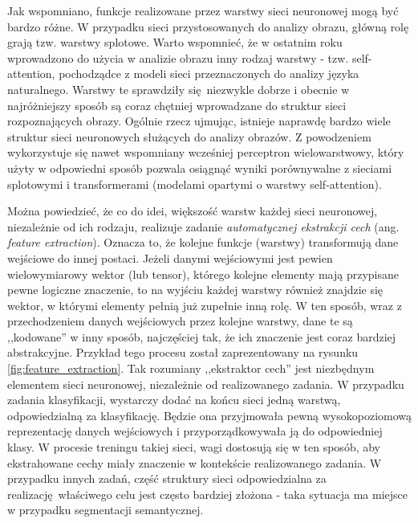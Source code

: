 \documentclass{classrep}
\begin{document}
{        %
        Jak wspomniano, funkcje realizowane przez warstwy sieci neuronowej mogą być bardzo różne. W
        przypadku sieci przystosowanych do analizy obrazu, główną rolę grają tzw. warstwy splotowe. Warto
        wspomnieć, że w ostatnim roku wprowadzono do użycia w analizie obrazu inny rodzaj warstwy - tzw.
        self-attention, pochodządce z modeli sieci przeznaczonych do analizy języka naturalnego. Warstwy te
        sprawdziły się niezwykle dobrze i obecnie w najróżniejszy sposób są coraz chętniej wprowadzane do
        struktur sieci rozpoznających obrazy. Ogólnie rzecz ujmując, istnieje naprawdę bardzo wiele struktur
        sieci neuronowych służących do analizy obrazów. Z powodzeniem wykorzystuje się nawet wspomniany
        wcześniej perceptron wielowarstwowy, który użyty w odpowiedni sposób pozwala osiągnąć wyniki
        porównywalne z sieciami splotowymi i transformerami (modelami opartymi o warstwy self-attention).

        Można powiedzieć, że co do idei, większość warstw każdej sieci neuronowej, niezależnie od ich
        rodzaju, realizuje zadanie \emph{automatycznej ekstrakcji cech} (ang. \emph{feature extraction}).
        Oznacza to, że kolejne funkcje (warstwy) transformują dane wejściowe do innej postaci. Jeżeli danymi
        wejściowymi jest pewien wielowymiarowy wektor (lub tensor), którego kolejne elementy mają przypisane
        pewne logiczne znaczenie, to na wyjściu każdej warstwy również znajdzie się wektor, w którymi
        elementy pełnią już zupełnie inną rolę. W ten sposób, wraz z przechodzeniem danych wejściowych przez
        kolejne warstwy, dane te są ,,kodowane'' w inny sposób, najczęściej tak, że ich znaczenie jest coraz
        bardziej abstrakcyjne. Przykład tego procesu został zaprezentowany na rysunku
        \ref{fig:feature_extraction}. Tak rozumiany ,,ekstraktor cech'' jest niezbędnym elementem sieci
        neuronowej, niezależnie od realizowanego zadania. W przypadku zadania klasyfikacji, wystarczy dodać
        na końcu sieci jedną warstwą, odpowiedzialną za klasyfikację. Będzie ona przyjmowała pewną
        wysokopoziomową reprezentację danych wejściowych i przyporządkowywała ją do odpowiedniej klasy. W
        procesie treningu takiej sieci, wagi dostosują się w ten sposób, aby ekstrahowane cechy miały
        znaczenie w kontekście realizowanego zadania. W przypadku innych zadań, część struktury sieci
        odpowiedzialna za realizację właściwego celu jest często bardziej złożona - taka sytuacja ma miejsce
        w przypadku segmentacji semantycznej.

}
\end{document}
